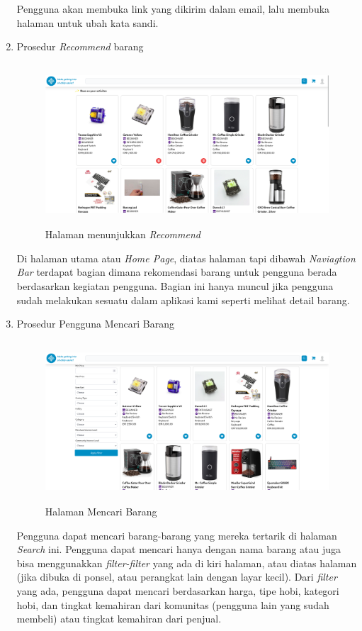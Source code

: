\documentclass[a4paper]{article}
\begin{document}
\begin{enumerate}
Pengguna akan membuka link yang dikirim dalam email, lalu membuka halaman untuk ubah kata sandi.

\item Prosedur \textit{Recommend} barang

\begin{figure}[h]
    \centering
    \includegraphics*[height=6cm]{images/prosedur pengunaan aplikasi/Recommend.png}
    \caption{Halaman menunjukkan \textit{Recommend}}
\end{figure}

Di halaman utama atau \textit{Home Page}, diatas halaman tapi dibawah \textit{Naviagtion Bar} terdapat bagian dimana rekomendasi barang untuk pengguna berada berdasarkan kegiatan pengguna. Bagian ini hanya muncul jika pengguna sudah melakukan sesuatu dalam aplikasi kami seperti melihat detail barang.

\item Prosedur Pengguna Mencari Barang

\begin{figure}[h]
    \centering
    \includegraphics*[height=6cm]{images/prosedur pengunaan aplikasi/Search.png}
    \caption{Halaman Mencari Barang}
\end{figure}

Pengguna dapat mencari barang-barang yang mereka tertarik di halaman \textit{Search} ini. Pengguna dapat mencari hanya dengan nama barang atau juga bisa menggunakkan \textit{filter-filter} yang ada di kiri halaman, atau diatas halaman (jika dibuka di ponsel, atau perangkat lain dengan layar kecil). Dari \textit{filter} yang ada, pengguna dapat mencari berdasarkan harga, tipe hobi, kategori hobi, dan tingkat kemahiran dari komunitas (pengguna lain yang sudah membeli) atau tingkat kemahiran dari penjual.


\end{enumerate}
\end{document}

